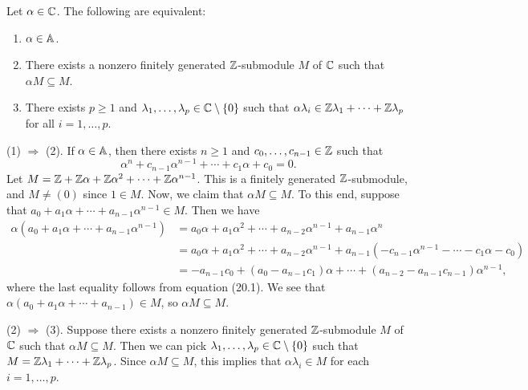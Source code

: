 \begin{theo}{}
    Let $\alpha \in \mathbb{C}$. The following are equivalent: 
    \begin{enumerate}[(1)]
        \item $\alpha \in \mathbb{A}$. 
        \item There exists a nonzero finitely generated $\mathbb{Z}$-submodule $M$ of 
              $\mathbb{C}$ such that $\alpha M \subseteq M$. 
        \item There exists $p \geq 1$ and $\lambda_1, \dots, \lambda_p \in 
              \mathbb{C} \setminus \{0\}$ such that $\alpha \lambda_i \in 
              \mathbb{Z}\lambda_1 + \cdots + \mathbb{Z}\lambda_p$ for all $i = 1, \dots, p$. 
    \end{enumerate}
\end{theo}
\begin{pf}
    (1) $\Rightarrow$ (2). If $\alpha \in \mathbb{A}$, then there exists $n \geq 1$ 
    and $c_0, \dots, c_{n-1} \in \mathbb{Z}$ such that 
    \begin{equation}
        \alpha^n + c_{n-1} \alpha^{n-1} + \cdots + c_1 \alpha + c_0 = 0. 
    \end{equation}
    Let $M = \mathbb{Z} + \mathbb{Z}\alpha + \mathbb{Z}\alpha^2 + \cdots + \mathbb{Z}\alpha^{n-1}$. This is a 
    finitely generated $\mathbb{Z}$-submodule, and $M \neq (0)$ since $1 \in M$. 
    Now, we claim that $\alpha M \subseteq M$. To this end, suppose that 
    $a_0 + a_1 \alpha + \cdots + a_{n-1} \alpha^{n-1} \in M$. Then we have 
    \begin{align*}
        \alpha (a_0 + a_1 \alpha + \cdots + a_{n-1} \alpha^{n-1}) 
        &= a_0 \alpha + a_1 \alpha^2 + \cdots + a_{n-2} \alpha^{n-1} 
        + a_{n-1} \alpha^n \\ 
        &= a_0 \alpha + a_1 \alpha^2 + \cdots + a_{n-2} \alpha^{n-1} 
        + a_{n-1} (- c_{n-1} \alpha^{n-1} - \cdots - c_1 \alpha - c_0) \\ 
        &= -a_{n-1} c_0 + (a_0 - a_{n-1} c_1) \alpha + \cdots + 
        (a_{n-2} - a_{n-1} c_{n-1}) \alpha^{n-1},
    \end{align*}
    where the last equality follows from equation (20.1).
    We see that $\alpha(a_0 + a_1 \alpha + \cdots + a_{n-1}) \in M$, so 
    $\alpha M \subseteq M$. 

    (2) $\Rightarrow$ (3). Suppose there exists a nonzero finitely generated 
    $\mathbb{Z}$-submodule $M$ of $\mathbb{C}$ such that $\alpha M \subseteq M$. Then we can 
    pick $\lambda_1, \dots, \lambda_p \in \mathbb{C} \setminus \{0\}$ such that 
    $M = \mathbb{Z}\lambda_1 + \cdots + \mathbb{Z}\lambda_p$. Since $\alpha M \subseteq M$,
    this implies that $\alpha \lambda_i \in M$ for each $i = 1, \dots, p$. 


\end{pf}
